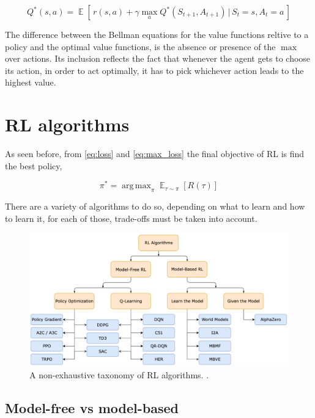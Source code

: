 \documentclass{article}
\DeclareMathOperator*{\E}{\mathbb{E}}
\DeclareMathOperator*{\argmax}{arg\,max}
\begin{document}
\begin{equation}
	Q^{*}(s,a) = \E[\, {r(s,a) + \gamma \max_a {Q^{*}(S_{t+1}, A_{t+1})} \,|\, S_t = s, A_t = a} \,]
\end{equation}

The difference between the Bellman equations for the value functions reltive to a policy and the optimal value functions, is the absence or presence of the $\max$ over actions. Its inclusion reflects the fact that whenever the agent gets to choose its action, in order to act optimally, it has to pick whichever action leads to the highest value.

\section{RL algorithms}
As seen before, from \autoref{eq:loss} and \autoref{eq:max_loss} the final objective of RL is find the best policy,

\begin{equation}
	\pi^* = \argmax_\pi \E_{\tau \sim \pi}{[R(\tau)]}
	\label{eq:objective}
\end{equation}

There are a variety of algorithms to do so, depending on what to learn and how to learn it, for each of those, trade-offs must be taken into account.

\begin{figure}[h]
	\centering
	\includegraphics[width=13cm]{rl-taxonomy.png}
	\caption{A non-exhaustive taxonomy of RL algorithms. \cite{SpinningUp2018}.}
	\label{fig:rl-taxonomy}
\end{figure}


\subsection{Model-free vs model-based}
\end{document}
